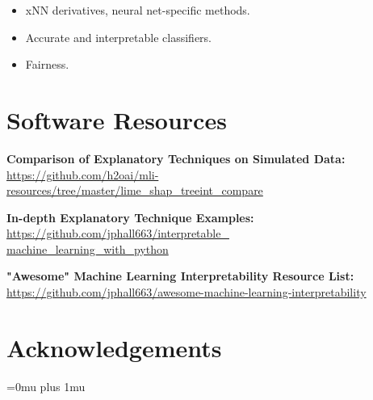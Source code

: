 \documentclass{article}
\begin{document}
\begin{itemize}
\item xNN derivatives, neural net-specific methods.
\item Accurate and interpretable classifiers.
\item Fairness.
\end{itemize} 

\section{Software Resources} \label{sec:software}

\sloppy

\textbf{Comparison of Explanatory Techniques on Simulated Data:}\\
\href{https://github.com/h2oai/mli-resources/tree/master/lime_shap_treeint_compare}{https://github.com/h2oai/mli-resources/tree/master/lime\_shap\_treeint\_compare}\\

\vspace{10pt}

\textbf{In-depth Explanatory Technique Examples:}\\
\href{https://github.com/jphall663/interpretable_machine_learning_with_python}{https://github.com/jphall663/interpretable\_\\machine\_learning\_with\_python}\\

\vspace{10pt}

\textbf{"Awesome" Machine Learning Interpretability Resource List:}\\
\href{https://github.com/jphall663/awesome-machine-learning-interpretability}{https://github.com/jphall663/awesome-machine-learning-interpretability}

\fussy

\section{Acknowledgements} 



\Urlmuskip=0mu plus 1mu\relax


\end{document}
